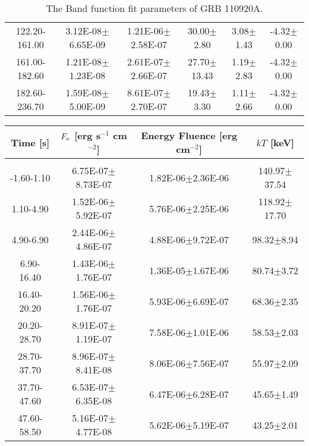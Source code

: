\begin{table}[h]
\begin{tabular}{c| c c c c c}
122.20-161.00 & 3.12E-08$\pm$6.65E-09 & 1.21E-06$\pm$2.58E-07 & 30.00$\pm$2.80 & 3.08$\pm$1.43 & -4.32$\pm$0.00 \\ 

161.00-182.60 & 1.21E-08$\pm$1.23E-08 & 2.61E-07$\pm$2.66E-07 & 27.70$\pm$13.43 & 1.19$\pm$2.83 & -4.32$\pm$0.00 \\ 

182.60-236.70 & 1.59E-08$\pm$5.00E-09 & 8.61E-07$\pm$2.70E-07 & 19.43$\pm$3.30 & 1.11$\pm$2.66 & -4.32$\pm$0.00 \\ 

\end{tabular}
\caption{The Band function fit parameters of GRB 110920A.}
\end{table}

\begin{table}[h]
\centering
\scriptsize
\label{tab:}
\begin{tabular}{c| c c c}
Time [s] & $F_{\nu}$ [erg s$^{-1}$ cm$^{-2}$] & Energy Fluence [erg cm$^{-2}$] & $kT$ [keV] \\
\hline \hline\\ 

-1.60-1.10 & 6.75E-07$\pm$8.73E-07 & 1.82E-06$\pm$2.36E-06 & 140.97$\pm$37.54 \\ 

1.10-4.90 & 1.52E-06$\pm$5.92E-07 & 5.76E-06$\pm$2.25E-06 & 118.92$\pm$17.70 \\ 

4.90-6.90 & 2.44E-06$\pm$4.86E-07 & 4.88E-06$\pm$9.72E-07 & 98.32$\pm$8.94 \\ 

6.90-16.40 & 1.43E-06$\pm$1.76E-07 & 1.36E-05$\pm$1.67E-06 & 80.74$\pm$3.72 \\ 

16.40-20.20 & 1.56E-06$\pm$1.76E-07 & 5.93E-06$\pm$6.69E-07 & 68.36$\pm$2.35 \\ 

20.20-28.70 & 8.91E-07$\pm$1.19E-07 & 7.58E-06$\pm$1.01E-06 & 58.53$\pm$2.03 \\ 

28.70-37.70 & 8.96E-07$\pm$8.41E-08 & 8.06E-06$\pm$7.56E-07 & 55.97$\pm$2.09 \\ 

37.70-47.60 & 6.53E-07$\pm$6.35E-08 & 6.47E-06$\pm$6.28E-07 & 45.65$\pm$1.49 \\ 

47.60-58.50 & 5.16E-07$\pm$4.77E-08 & 5.62E-06$\pm$5.19E-07 & 43.25$\pm$2.01 \\ 


\end{tabular}
\end{table}
